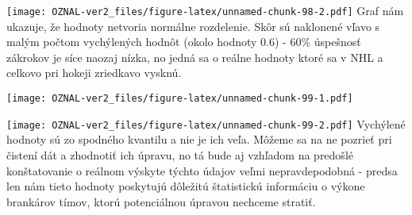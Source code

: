 \documentclass[
]{article}
\newenvironment{Shaded}{\begin{snugshade}}{\end{snugshade}}
\newcommand{\AttributeTok}[1]{\textcolor[rgb]{0.77,0.63,0.00}{#1}}
\newcommand{\DecValTok}[1]{\textcolor[rgb]{0.00,0.00,0.81}{#1}}
\newcommand{\FunctionTok}[1]{\textcolor[rgb]{0.00,0.00,0.00}{#1}}
\newcommand{\NormalTok}[1]{#1}
\newcommand{\SpecialCharTok}[1]{\textcolor[rgb]{0.00,0.00,0.00}{#1}}
\newcommand{\StringTok}[1]{\textcolor[rgb]{0.31,0.60,0.02}{#1}}
\begin{document}
\begin{Shaded}
\end{Shaded}

\texttt{[image: OZNAL-ver2\_files/figure-latex/unnamed-chunk-98-2.pdf]}
Graf nám ukazuje, že hodnoty netvoria normálne rozdelenie. Skôr sú
naklonené vľavo s malým počtom vychýlených hodnôt (okolo hodnoty 0.6) -
60\% úspešnosť zákrokov je síce naozaj nízka, no jedná sa o reálne
hodnoty ktoré sa v NHL a celkovo pri hokeji zriedkavo vysknú.

\begin{Shaded}
\end{Shaded}

\texttt{[image: OZNAL-ver2\_files/figure-latex/unnamed-chunk-99-1.pdf]}

\begin{Shaded}
\end{Shaded}

\texttt{[image: OZNAL-ver2\_files/figure-latex/unnamed-chunk-99-2.pdf]}
Vychýlené hodnoty sú zo spodného kvantilu a nie je ich veľa. Môžeme sa
na ne pozrieť pri čistení dát a zhodnotiť ich úpravu, no tá bude aj
vzhľadom na predošlé konštatovanie o reálnom výskyte týchto údajov veľmi
nepravdepodobná - predsa len nám tieto hodnoty poskytujú dôležitú
štatistickú informáciu o výkone brankárov tímov, ktorú potenciálnou
úpravou nechceme stratiť.
\end{document}
